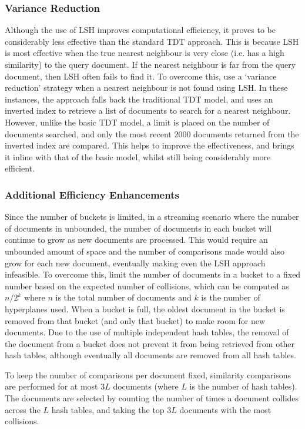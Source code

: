 \subsubsection{Variance Reduction}
Although the use of LSH improves computational efficiency, it proves to be considerably less effective than the standard TDT approach.
This is because LSH is most effective when the true nearest neighbour is very close (i.e. has a high similarity) to the query document.
If the nearest neighbour is far from the query document, then LSH often fails to find it.
To overcome this, \cite{Petrovic:2010:SFS:1857999.1858020} use a `variance reduction' strategy when a nearest neighbour is not found using LSH.
In these instances, the approach falls back the traditional TDT model, and uses an inverted index to retrieve a list of documents to search for a nearest neighbour.
However, unlike the basic TDT model, a limit is placed on the number of documents searched, and only the most recent 2000 documents returned from the inverted index are compared.
This helps to improve the effectiveness, and brings it inline with that of the basic model, whilst still being considerably more efficient.

\subsubsection{Additional Efficiency Enhancements}
Since the number of buckets is limited, in a streaming scenario where the number of documents in unbounded, the number of documents in each bucket will continue to grow as new documents are processed.
This would require an unbounded amount of space and the number of comparisons made would also grow for each new document, eventually making even the LSH approach infeasible.
To overcome this, \cite{Petrovic:2010:SFS:1857999.1858020} limit the number of documents in a bucket to a fixed number based on the expected number of collisions, which can be computed as $n/2^k$ where $n$ is the total number of documents and $k$ is the number of hyperplanes used.
When a bucket is full, the oldest document in the bucket is removed from that bucket (and only that bucket) to make room for new documents.
Due to the use of multiple independent hash tables, the removal of the document from a bucket does not prevent it from being retrieved from other hash tables, although eventually all documents are removed from all hash tables.

To keep the number of comparisons per document fixed, similarity comparisons are performed for at most $3L$ documents (where $L$ is the number of hash tables).
The documents are selected by counting the number of times a document collides across the $L$ hash tables, and taking the top $3L$ documents with the most collisions.

